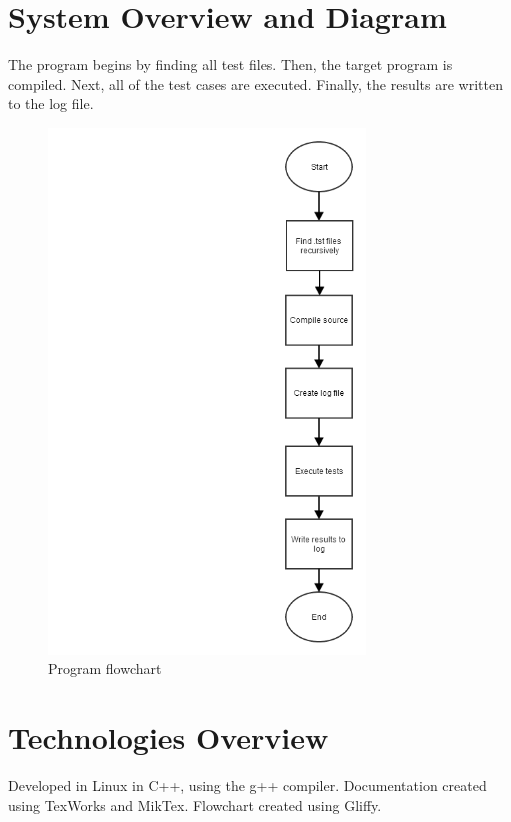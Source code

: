 \section{System Overview and Diagram}
The program begins by finding all test files. Then, the target program is compiled. Next, all of the test cases are executed. Finally, the results are written to the log file.

\begin{figure}[tbh]
\begin{center}
\includegraphics[width=0.75\textwidth]{./soft_eng_prog1}
\end{center}
\caption{Program flowchart \label{systemdiagram}}
\end{figure}

\section{Technologies Overview}
Developed in Linux in C++, using the g++ compiler.\newline
Documentation created using TexWorks and MikTex.\newline
Flowchart created using Gliffy.\newline

